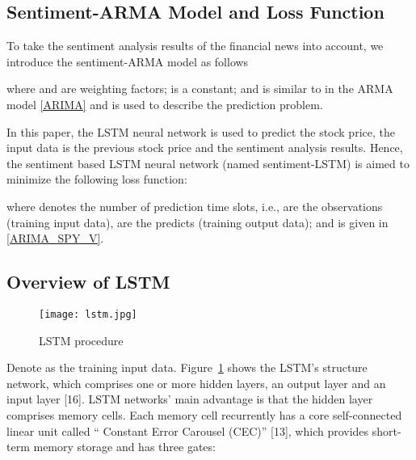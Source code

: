 \documentclass{article}
\begin{document}
\subsection{Sentiment-ARMA Model and Loss Function}

To take the sentiment analysis results of the financial news into account, we introduce the sentiment-ARMA model as follows

where  and  are weighting factors;  is a constant; and  is similar to  in the ARMA model \eqref{ARIMA} and is used to describe the prediction problem.


In this paper, the LSTM neural network is used to predict the stock price, the input data is the previous stock price and the sentiment analysis results. Hence, the sentiment based LSTM neural network (named sentiment-LSTM) is aimed to minimize the following loss function:

where  denotes the number of prediction time slots, i.e.,  are the observations (training input data),  are the predicts (training output data); and  is given in \eqref{ARIMA_SPY_V}. 



\subsection{Overview of LSTM}

\begin{figure}
  \centering
  \texttt{[image: lstm.jpg]}
  \caption{LSTM procedure}
  \label{figure:Mid-LSTM}
\end{figure}



Denote  as the training input data. Figure~\ref{figure:Mid-LSTM} shows the LSTM's structure network, which comprises one or more hidden layers, an output layer and an input layer [16]. LSTM networks' main advantage is that the hidden layer comprises memory cells. Each memory cell recurrently has a core self-connected linear unit called `` Constant Error Carousel (CEC)'' [13], which provides short-term memory storage and has three gates:
\end{document}
